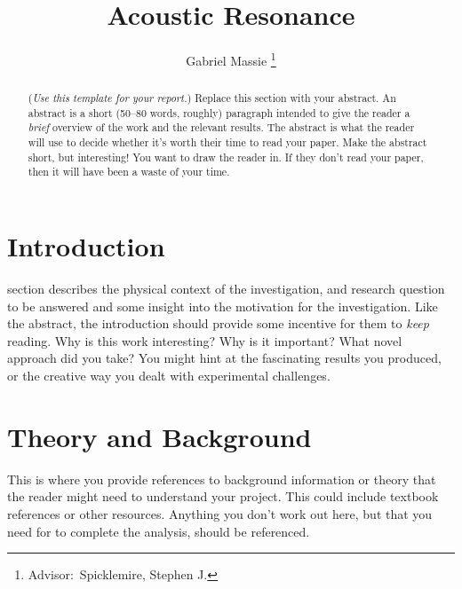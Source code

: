 \documentclass[journal, a4paper]{IEEEtran}
\begin{document}
	\title{Acoustic Resonance}
	\author{Gabriel Massie
	\thanks{Advisor:~Spicklemire, Stephen J.}}
	\maketitle

\begin{abstract}
(\textit{Use this template for your report.}) Replace this section with your abstract. An abstract is a short (50--80 words, roughly) paragraph intended to give the reader a {\it brief} overview of the work and the relevant results. The abstract is what the reader will use to decide whether it's worth their time to read your paper. Make the abstract short, but interesting! You want to draw the reader in. If they don't read your paper, then it will have been a waste of your time.
\end{abstract}

\section{Introduction}
	 section describes the physical context of the investigation, and research question to be answered and some insight into the motivation for the investigation. Like the abstract, the introduction should provide some incentive for them to \textit{keep} reading. Why is this work interesting? Why is it important? What novel approach did you take? You might hint at the fascinating results you produced, or the creative way you dealt with experimental challenges.
\section{Theory and Background}
	This is where you provide references to background information or theory that the reader might need to understand your project. This could include textbook references or other resources. Anything you don't work out here, but that you need for to complete the analysis, should be referenced.
\end{document}
